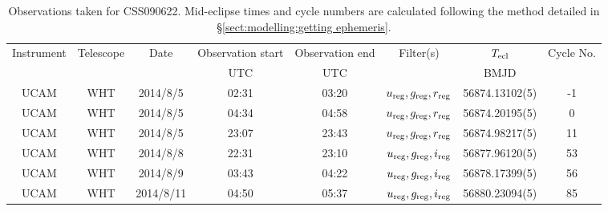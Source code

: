 \begin{table}
	\begin{center}
		\caption{Observations taken for CSS090622. Mid-eclipse times and cycle numbers are calculated following the method detailed in \S\ref{sect:modelling:getting ephemeris}.}
		\label{table:observing:observation logs CSS090622}
		\begin{tabular}{cccccccc}
			\hline
			Instrument & Telescope & Date & Observation start & Observation end & Filter(s) & $T_{\rm ecl}$ & Cycle No. \\
			 &  &  & UTC & UTC &  & BMJD &  \\
			\hline
			\hline
			UCAM & WHT & 2014/8/5  & 02:31 & 03:20 & $u_{\rm reg},g_{\rm reg},r_{\rm reg}$ & 56874.13102(5)                                                                                                            &                                          -1 \\
			UCAM & WHT & 2014/8/5  & 04:34 & 04:58 & $u_{\rm reg},g_{\rm reg},r_{\rm reg}$ & 56874.20195(5)                                                                                                            &                                           0 \\
			UCAM & WHT & 2014/8/5  & 23:07 & 23:43 & $u_{\rm reg},g_{\rm reg},r_{\rm reg}$ & 56874.98217(5)                                                                                                            &                                          11 \\
			UCAM & WHT & 2014/8/8  & 22:31 & 23:10 & $u_{\rm reg},g_{\rm reg},i_{\rm reg}$ & 56877.96120(5)                                                                                                            &                                          53 \\
			UCAM & WHT & 2014/8/9  & 03:43 & 04:22 & $u_{\rm reg},g_{\rm reg},i_{\rm reg}$ & 56878.17399(5)                                                                                                            &                                          56 \\
			UCAM & WHT & 2014/8/11 & 04:50 & 05:37 & $u_{\rm reg},g_{\rm reg},i_{\rm reg}$ & 56880.23094(5)                                                                                                            &                                          85 \\
		   \hline
		\end{tabular}
	\end{center}
\end{table}